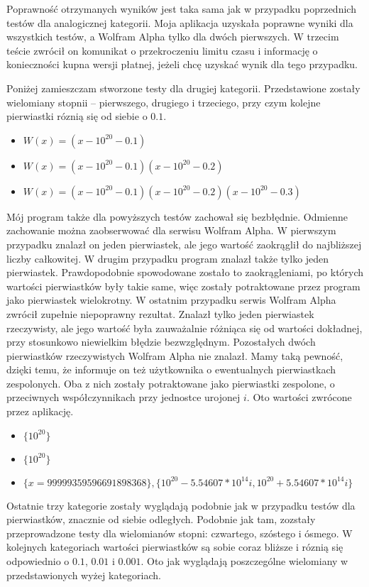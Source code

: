 \documentclass[oneside,a4paper]{book}
\begin{document}
	Poprawność otrzymanych wyników jest taka sama jak w przypadku poprzednich testów dla analogicznej kategorii. Moja aplikacja uzyskała poprawne wyniki dla wszystkich testów, a Wolfram Alpha tylko dla dwóch pierwszych. W trzecim teście zwrócił on komunikat o przekroczeniu limitu czasu i informację o konieczności kupna wersji płatnej, jeżeli chcę uzyskać wynik dla tego przypadku.
	
	Poniżej zamieszczam stworzone testy dla drugiej kategorii. Przedstawione zostały wielomiany stopnii -- pierwszego, drugiego i trzeciego, przy czym kolejne pierwiastki róznią się od siebie o $0.1$.
	\begin{itemize}
		\item $W(x)=(x-10^{20}-0.1)$
		\item $W(x)=(x-10^{20}-0.1)(x-10^{20}-0.2)$
		\item $W(x)=(x-10^{20}-0.1)(x-10^{20}-0.2)(x-10^{20}-0.3)$
	\end{itemize}
	
	Mój program także dla powyższych testów zachował się bezbłędnie. Odmienne zachowanie można zaobserwować dla serwisu Wolfram Alpha. W pierwszym przypadku znalazł on jeden pierwiastek, ale jego wartość zaokrąglił do najbliższej liczby całkowitej. W drugim przypadku program znalazł także tylko jeden pierwiastek. Prawdopodobnie spowodowane zostało to zaokrągleniami, po których wartości pierwiastków były takie same, więc zostały potraktowane przez program jako pierwiastek wielokrotny. W ostatnim przypadku serwis Wolfram Alpha zwrócił zupełnie niepoprawny rezultat. Znalazł tylko jeden pierwiastek rzeczywisty, ale jego wartość była zauważalnie różniąca się od wartości dokładnej, przy stosunkowo niewielkim błędzie bezwzględnym. Pozostałych dwóch pierwiastków rzeczywistych Wolfram Alpha nie znalazł. Mamy taką pewność, dzięki temu, że informuje on też użytkownika o ewentualnych pierwiastkach zespolonych. Oba z nich zostały potraktowane jako pierwiastki zespolone, o przeciwnych współczynnikach przy jednostce urojonej $i$. Oto wartości zwrócone przez aplikację.
	\begin{itemize}
		\item $\{10^{20}\}$
		\item $\{10^{20}\}$
		\item $\{x = 99999359596691898368\}, \{10^{20}-5.54607*10^{14}i, 10^{20}+5.54607*10^{14}i\}$
	\end{itemize}
	
	Ostatnie trzy kategorie zostały wyglądają podobnie jak w przypadku testów dla pierwiastków, znacznie od siebie odległych. Podobnie jak tam, zozstały przeprowadzone testy dla wielomianów stopni: czwartego, szóstego i ósmego. W kolejnych kategoriach wartości pierwiastków są sobie coraz bliższe i róznią się odpowiednio o $0.1$, $0.01$ i $0.001$. Oto jak wyglądają poszczególne wielomiany w przedstawionych wyżej kategoriach.
	
\end{document}
